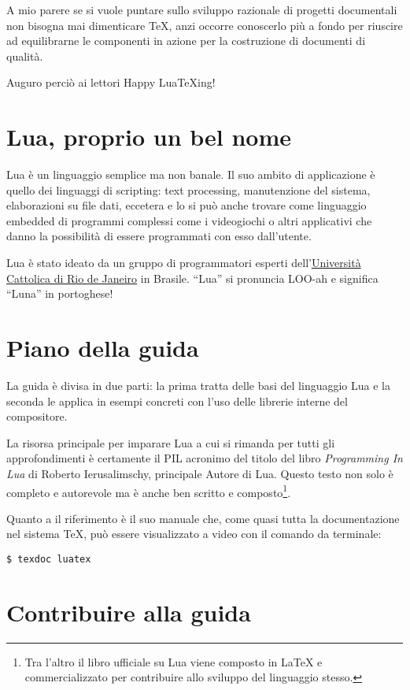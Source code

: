 A mio parere se si vuole puntare sullo sviluppo razionale di progetti
documentali non bisogna mai dimenticare \TeX{}, anzi occorre conoscerlo più a
fondo per riuscire ad equilibrarne le componenti in azione per la costruzione di
documenti di qualità.

Auguro perciò ai lettori Happy LuaTeXing!


\section{Lua, proprio un bel nome}

Lua è un linguaggio semplice ma non banale. Il suo ambito di applicazione è
quello dei linguaggi di scripting: text processing, manutenzione del sistema,
elaborazioni su file dati, eccetera e lo si può anche trovare come linguaggio
embedded di programmi complessi come i videogiochi o altri applicativi
che danno la possibilità di essere programmati con esso dall'utente.

Lua è stato ideato da un gruppo di programmatori esperti
dell'\href{http://www.puc-rio.br/index.html}{Università Cattolica di Rio de
Janeiro} in Brasile. ``Lua'' si pronuncia LOO-ah e significa ``Luna'' in
portoghese!


\section{Piano della guida}

La guida è divisa in due parti: la prima tratta delle basi del linguaggio Lua e
la seconda le applica in esempi concreti con l'uso delle librerie interne del
compositore.

La risorsa principale per imparare Lua a cui si rimanda per tutti gli
approfondimenti è certamente il PIL acronimo del titolo del libro
\emph{Programming In Lua} di Roberto Ierusalimschy, principale Autore
di Lua. Questo testo non solo è completo e autorevole ma è anche ben scritto e
composto\footnote{Tra l'altro il libro ufficiale su Lua viene composto in
\LaTeX{} e commercializzato per contribuire allo sviluppo del linguaggio
stesso.}.

Quanto a \LuaTeX{} il riferimento è il suo manuale che, come quasi tutta la
documentazione nel sistema \TeX{}, può essere visualizzato a video con il
comando da terminale:
\begin{Verbatim}
$ texdoc luatex
\end{Verbatim}


\section{Contribuire alla guida}

